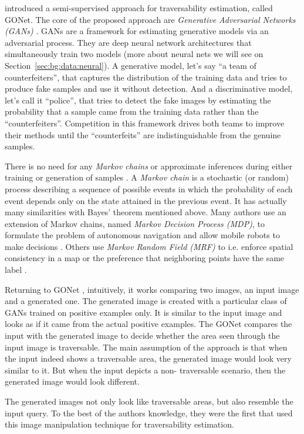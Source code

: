 \documentclass[12pt,a4paper,table,dvipsnames,tikz]{report}
\newcommand{\alleg}{\enquote}
\newcommand{\term}{\textit}
\newcommand{\acronym}{\MakeUppercase}
\begin{document}
	\citet{HiroseGonet} introduced a semi-supervised approach for traversability 
	estimation, called GONet. The core of the proposed approach are \term{Generative 
	Adversarial Networks (\acronym{gan}s)} \citep{Goodfellow}. \acronym{gan}s are a 
	framework for estimating generative models via an adversarial process. They 
	are deep neural network architectures that simultaneously train two models (more 
	about neural nets we will see on Section~\ref{sec:bg:data:neural}). A generative 
	model, let's say \alleg{a team of counterfeiters}, that captures the distribution 
	of the training data and tries to produce fake samples and use it without detection. 
	And a discriminative model, let's call it \alleg{police}, that tries to detect 
	the fake images by estimating the probability that a sample came from the training 
	data rather than the \alleg{counterfeiters}. Competition in this framework drives 
	both teams to improve their methods until the \alleg{counterfeits} are 
	indistinguishable from the genuine samples.
	\par
	There is no need for any \term{Markov chains} or approximate inferences during 
	either training or generation of samples \citep{Goodfellow}. A \term{Markov chain} 
	is a stochastic (or random) process describing a sequence of possible events in 
	which the probability of each event depends only on the state attained in the 
	previous event. It has actually many similarities with Bayes' theorem mentioned 
	above. Many authors use an extension of Markov chains, named \term{Markov Decision 
	Process (\acronym{mdp})}, to formulate the problem of autonomous navigation and 
	allow mobile robots to make decisions \citep{Wigness, Zhelo}. Others use 
	\term{Markov Random Field (\acronym{mrf})} \citep{Li} to i.e. enforce spatial 
	consistency in a map or the preference that neighboring points have the same label 
	\citep{Lalonde}.
	\par
	Returning to GONet \citep{HiroseGonet}, intuitively, it works comparing two images, 
	an input image and a generated one. The generated image is created with a 
	particular class of \acronym{gan}s trained on positive examples only. It is 
	similar to the input image and looks as if it came from the actual positive 
	examples. The GONet compares the input with the generated image to decide whether 
	the area seen through the input image is traversable. The main assumption of 
	the approach is that when the input indeed shows a traversable area, the 
	generated image would look very similar to it. But when the input depicts a non-
	traversable scenario, then the generated image would look different.
	\par
	The generated images not only look like	traversable areas, but also resemble the 
	input query. To the best of the authors knowledge, they were the first that used 
	this image manipulation technique for traversability estimation.
	\\\\
	
\end{document}
